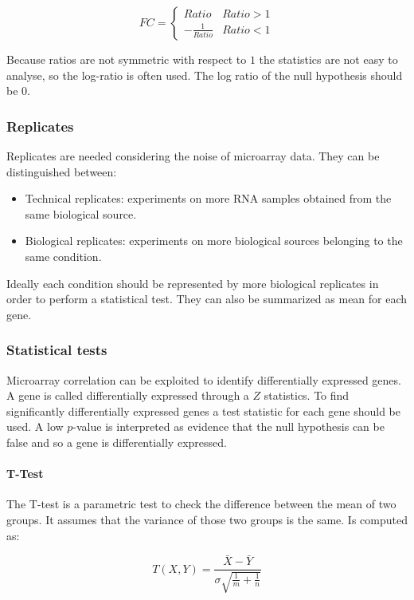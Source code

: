 	$$FC = \begin{cases}Ratio & Ratio>1\\-\frac{1}{Ratio} & Ratio <1\end{cases}$$

	Because ratios are not symmetric with respect to $1$ the statistics are not easy to analyse, so the log-ratio is often used.
	The log ratio of the null hypothesis should be $0$.

		\subsubsection{Replicates}
		Replicates are needed considering the noise of microarray data.
		They can be distinguished between:

		\begin{multicols}{2}
			\begin{itemize}
				\item Technical replicates: experiments on more RNA samples obtained from the same biological source.
				\item Biological replicates: experiments on more biological sources belonging to the same condition.
			\end{itemize}
		\end{multicols}

		Ideally each condition should be represented by more biological replicates in order to perform a statistical test.
		They can also be summarized as mean for each gene.

		\subsubsection{Statistical tests}
		Microarray correlation can be exploited to identify differentially expressed genes.
		A gene is called differentially expressed through a $Z$ statistics.
		To find significantly differentially expressed genes a test statistic for each gene should be used.
		A low $p$-value is interpreted as evidence that the null hypothesis can be false and so a gene is differentially expressed.

			\paragraph{T-Test}
			The T-test is a parametric test to check the difference between the mean of two groups.
			It assumes that the variance of those two groups is the same.
			Is computed as:

			$$T(X, Y) = \frac{\bar{X}-\bar{Y}}{\sigma\sqrt{\frac{1}{m}+\frac{1}{n}}}$$

